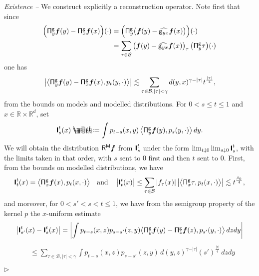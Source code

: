 \documentclass[10pt, reqno]{amsart}
\makeatletter
\numberwithin{subsection}{section}
\numberwithin{subsubsection}{subsection}
\numberwithin{equation}{section} %
\newenvironment{Dem}[1][\unskip]{%
    \begin{list}{\hspace{1.15cm}{\sf \textbf{{\small Proof #1 --}}}}{%
        \setlength{\topsep}{0pt}%
        \setlength{\leftmargin}{0pt}%
        \setlength{\rightmargin}{0pt}%
        \setlength{\listparindent}{0pt}%
        \setlength{\itemindent}{0pt}%
        \setlength{\parsep}{0pt}%
        \addtolength{\leftmargin}{0pt}%
        \addtolength{\rightmargin}{0pt}%
    } \item }{\hfill $\rhd$\end{list}\smallskip}
\theoremstyle{mystyle}
\theoremstyle{mystyle2}
\theoremstyle{mystyle3}
\newcommand{\bsf}{\boldsymbol{f}}
\newcommand\bbR{\mathbb{R}}
\newcommand{\mcB}{\mathcal{B}}
\newcommand*{\defeq}{\mathrel{\rlap{%
                     \raisebox{0.3ex}{$\m@th\cdot$}}%
                     \raisebox{-0.3ex}{$\m@th\cdot$}}%
                     =}
\makeatother
\begin{document}
\medskip

\begin{Dem}
{\it Existence --} We construct explicitly a reconstruction operator. Note first that since
\begin{equation*} \begin{split}
\Big({\sf \Pi}^{\sf g}_y\bsf(y) - {\sf \Pi}^{\sf g}_x\bsf(x)\Big)(\cdot) &= \Big({\sf \Pi}^{\sf g}_y\big(\bsf(y) - \widehat{{\sf g}_{yx}}\bsf(x)\big)\Big)(\cdot)   \\
&=\sum_{\tau\in\mcB} 
\big(\bsf(y) - \widehat{{\sf g}_{yx}}\bsf(x)\big)_\tau
\,\big({\sf \Pi}^{\sf g}_y\tau\big)(\cdot)
\end{split} \end{equation*}
one has 
\begin{equation*} \begin{split}
\left\vert\big\langle {\sf \Pi}^{\sf g}_y\bsf(y) - {\sf \Pi}^{\sf g}_x\bsf(x) , p_t(y,\cdot) \big\rangle\right\vert \lesssim \sum_{\tau\in\mcB, \vert\tau\vert<\gamma} d(y,x)^{\gamma-\vert\tau\vert} t^{\frac{\vert\tau\vert}{4}},
\end{split} \end{equation*}
from the bounds on models and modelled distributions. For $0<s\leq t\leq 1$ and $x\in\bbR\times\bbR^d$, set 
$$
\textbf{\textsf{I}}_s^t(x) \defeq  \int p_{t-s}(x,y) \, \big\langle {\sf \Pi}^{\sf g}_y\bsf(y) , p_s(y,\cdot) \big\rangle\,dy.
$$
We will obtain the distribution ${\sf R}^{\sf M}\bsf$ from $\textbf{\textsf{I}}_s^t$ under the form $\lim_{t\downarrow 0}\lim_{s\downarrow 0}\textbf{\textsf{I}}_s^t$, with the limits taken in that order, with $s$ sent to $0$ first and then $t$ sent to $0$. First, from the bounds on modelled 
distributions, we have
$$
\textbf{\textsf{I}}_t^t(x) = \big\langle {\sf \Pi}^{\sf g}_x\bsf(x) , p_t(x,\cdot) \big\rangle
\quad \textrm{and} \quad
\left\vert \textbf{\textsf{I}}_t^t(x) \right\vert
\le
\sum_{\tau\in\mcB} \left\vert f_\tau(x) \right\vert \left\vert \big\langle {\sf \Pi}^{\sf g}_x\tau , p_t(x,\cdot) \big\rangle \right\vert 
\lesssim
t^{\frac{\beta_0}{4}},
$$
and moreover, for $0<s'<s<t\leq 1$, we have from the semigroup property of the kernel $p$ the $x$-uniform estimate
$$
\left\vert \textbf{\textsf{I}}_{s'}^t(x) - \textbf{\textsf{I}}_s^t(x) \right\vert 
= \left\vert \int p_{t-s}(x,z)p_{s-s'}(z,y) \big\langle {\sf \Pi}^{\sf g}_{y}\bsf(y) - {\sf \Pi}^{\sf g}_z\bsf(z) , p_{s'}(y,\cdot)\big\rangle\,dzdy\right\vert
$$
\begin{equation*} \begin{split}
&\leq \sum_{\tau\in\mcB, \vert\tau\vert<\gamma} \int p_{t-s}(x,z)p_{s-s'}(z,y)\,d(y,z)^{\gamma-\vert\tau\vert}(s')^{\frac{\vert\tau\vert}{4}}\,dzdy   \\

\end{split}
\end{equation*}
\end{Dem}
\end{document}
